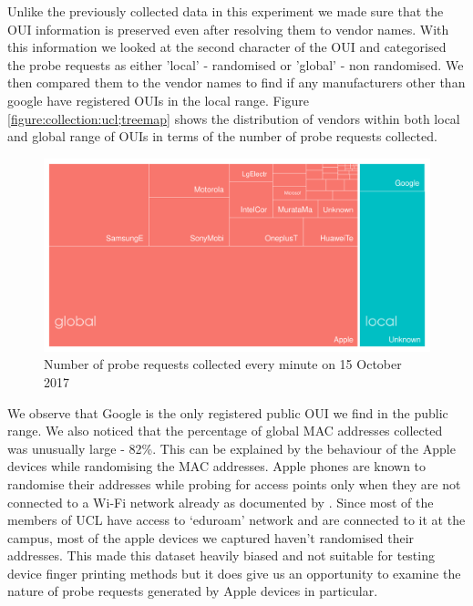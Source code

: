 Unlike the previously collected data in this experiment we made sure that the OUI information is preserved even after resolving them to vendor names.
With this information we looked at the second character of the OUI and categorised the probe requests as either 'local' - randomised or 'global' - non randomised.
We then compared them to the vendor names to find if any manufacturers other than google have registered OUIs in the local range.
Figure \ref{figure:collection:ucl;treemap} shows the distribution of vendors within both local and global range of OUIs in terms of the number of probe requests collected.

\begin{figure}
  \includegraphics{images/ucl-local-treemap.png}
  \caption{Number of probe requests collected every minute on 15 October 2017}
  \label{figure:collection:ucl:treemap}
\end{figure}

We observe that Google is the only registered public OUI we find in the public range. 
We also noticed that the percentage of global MAC addresses collected was unusually large - 82\%.
This can be explained by the behaviour of the Apple devices while randomising the MAC addresses. 
Apple phones are known to randomise their addresses while probing for access points only when they are not connected to a Wi-Fi network already as documented by \citet{vanhoef2016}.
Since most of the members of UCL have access to `eduroam' network and are connected to it at the campus, most of the apple devices we captured haven't randomised their addresses.
This made this dataset heavily biased and not suitable for testing device finger printing methods but it does give us an opportunity to examine the nature of probe requests generated by Apple devices in particular.


